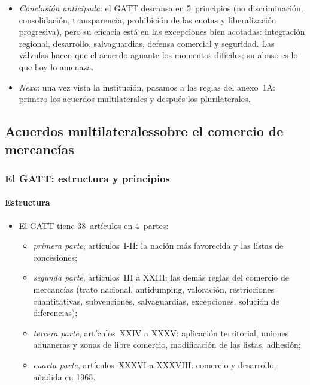 \documentclass[11pt]{article}
\begin{document}
\begin{itemize}
\item \emph{Conclusión anticipada}: el GATT descansa en 5~principios (no discriminación, consolidación, transparencia, prohibición de las cuotas y liberalización progresiva), pero su eficacia está en las excepciones bien acotadas: integración regional, desarrollo, salvaguardias, defensa comercial y seguridad. Las válvulas hacen que el acuerdo aguante los momentos difíciles; su abuso es lo que hoy lo amenaza.
\item \emph{Nexo}: una vez vista la institución, pasamos a las reglas del anexo~1A: primero los acuerdos multilaterales y después los plurilaterales.
\end{itemize}

\subsection{Acuerdos multilaterales\cortetitulo sobre el comercio de mercancías}\label{sec:multilaterales}

\subsubsection{El GATT: estructura y principios}\label{sec:gatt}

\paragraph{Estructura}

\begin{itemize}
\item El GATT tiene 38~artículos en 4~partes\nocite{GATT1947}:
  \begin{itemize}
  \item \emph{primera parte}, artículos~I-II: la nación más favorecida y las listas de concesiones;
  \item \emph{segunda parte}, artículos~III a XXIII: las demás reglas del comercio de mercancías (trato nacional, antidumping, valoración, restricciones cuantitativas, subvenciones, salvaguardias, excepciones, solución de diferencias);
  \item \emph{tercera parte}, artículos~XXIV a XXXV: aplicación territorial, uniones aduaneras y zonas de libre comercio, modificación de las listas, adhesión;
  \item \emph{cuarta parte}, artículos~XXXVI a XXXVIII: comercio y desarrollo, añadida en 1965.
  \end{itemize}
\end{itemize}
\end{document}
